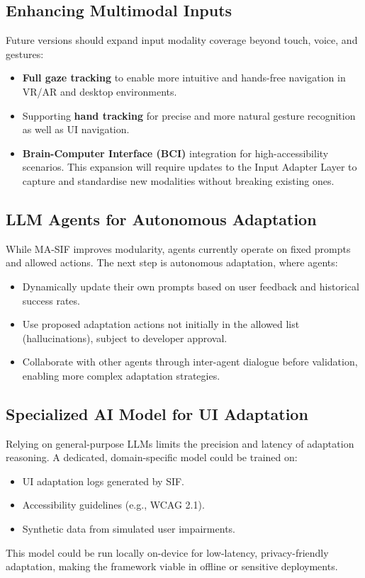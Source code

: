 \documentclass[openany]{book}
\begin{document}
\subsection{Enhancing Multimodal Inputs}
Future versions should expand input modality coverage beyond touch, voice, and gestures:
\begin{itemize}
    \item \textbf{Full gaze tracking} to enable more intuitive and hands-free navigation in VR/AR and desktop environments.
    \item Supporting \textbf{hand tracking} for precise and more natural gesture recognition as well as UI navigation.
    \item \textbf{Brain-Computer Interface (BCI)} integration for high-accessibility scenarios. This expansion will require updates to the Input Adapter Layer to capture and standardise new modalities without breaking existing ones.
\end{itemize}

\subsection{LLM Agents for Autonomous Adaptation}
While MA-SIF improves modularity, agents currently operate on fixed prompts and allowed actions. The next step is autonomous adaptation, where agents:
\begin{itemize}
    \item Dynamically update their own prompts based on user feedback and historical success rates.
    \item Use proposed adaptation actions not initially in the allowed list (hallucinations), subject to developer approval.
    \item Collaborate with other agents through inter-agent dialogue before validation, enabling more complex adaptation strategies.
\end{itemize}

\subsection{Specialized AI Model for UI Adaptation}
Relying on general-purpose LLMs limits the precision and latency of adaptation reasoning. A dedicated, domain-specific model could be trained on:
\begin{itemize}
    \item UI adaptation logs generated by SIF.
    \item Accessibility guidelines (e.g., WCAG 2.1).
    \item Synthetic data from simulated user impairments.
\end{itemize}
This model could be run locally on-device for low-latency, privacy-friendly adaptation, making the framework viable in offline or sensitive deployments.
\end{document}
